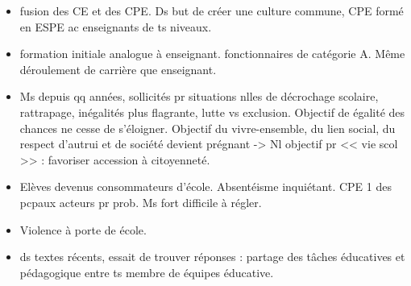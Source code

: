 \documentclass[12pt]{report}
\begin{document}
\begin{itemize}
\item fusion des CE et des CPE. Ds but de créer une culture commune, CPE formé en ESPE ac enseignants de ts niveaux.\\

\item formation initiale analogue à enseignant. fonctionnaires de catégorie A. Même déroulement de carrière que enseignant.\\

\item Ms depuis qq années, sollicités pr situations nlles de décrochage scolaire, rattrapage, inégalités plus flagrante, lutte vs exclusion. Objectif de égalité des chances ne cesse de s'éloigner. Objectif du vivre-ensemble, du lien social, du respect d'autrui et de société devient prégnant -> Nl objectif pr << vie scol >> : favoriser accession à citoyenneté. \\

\item Elèves devenus consommateurs d'école. Absentéisme inquiétant. CPE 1 des pcpaux acteurs pr prob. Ms fort difficile à régler.\\

\item Violence à porte de école. \\

\item ds textes récents, essait de trouver réponses : partage des tâches éducatives et pédagogique entre ts membre de équipes éducative.

\end{itemize}
\end{document}
